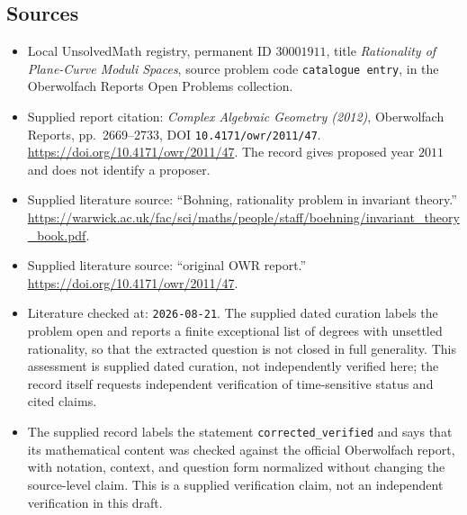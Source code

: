 \documentclass[11pt]{article}
\begin{document}
\subsection{Sources}
\begin{itemize}
\item Local UnsolvedMath registry, permanent ID \(30001911\), title \emph{Rationality of Plane-Curve Moduli Spaces}, source problem code \texttt{catalogue entry}, in the Oberwolfach Reports Open Problems collection.
\item Supplied report citation: \emph{Complex Algebraic Geometry (2012)}, Oberwolfach Reports, pp.\ 2669--2733, DOI \texttt{10.4171/owr/2011/47}. \url{https://doi.org/10.4171/owr/2011/47}. The record gives proposed year \(2011\) and does not identify a proposer.
\item Supplied literature source: ``Bohning, rationality problem in invariant theory.'' \url{https://warwick.ac.uk/fac/sci/maths/people/staff/boehning/invariant_theory_book.pdf}.
\item Supplied literature source: ``original OWR report.'' \url{https://doi.org/10.4171/owr/2011/47}.
\item Literature checked at: \texttt{2026-08-21}. The supplied dated curation labels the problem open and reports a finite exceptional list of degrees with unsettled rationality, so that the extracted question is not closed in full generality. This assessment is supplied dated curation, not independently verified here; the record itself requests independent verification of time-sensitive status and cited claims.
\item The supplied record labels the statement \texttt{corrected\_verified} and says that its mathematical content was checked against the official Oberwolfach report, with notation, context, and question form normalized without changing the source-level claim. This is a supplied verification claim, not an independent verification in this draft.
\end{itemize}
\end{document}

